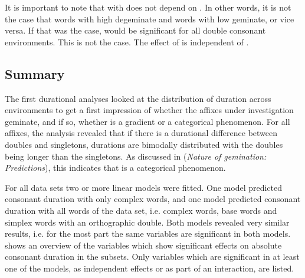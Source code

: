 It is important to note that  with  does not depend on . In other words, it is not the case that words with high  degeminate and words with low  geminate, or vice versa. If that was the case,  would be significant for all double consonant environments. This is not the case. The effect of  is independent of . 


\subsection{Summary} \label{discussion experiment}

The first durational analyses looked at the distribution of duration across environments to get a first impression of whether the affixes under investigation geminate, and if so, whether  is a gradient or a categorical phenomenon. 
For all affixes,  the analysis revealed that if there is a durational difference between doubles and singletons, durations are bimodally distributed with the doubles being longer than the singletons. As discussed in  (\textit{Nature of {gemination}: Predictions}), this indicates that  is a categorical phenomenon.

For all data sets two or more linear models were fitted. One model predicted consonant duration with only complex words, and one model predicted consonant duration with all words of the data set, i.e. complex words, base words and simplex words with an orthographic double. 
Both models revealed very similar results, i.e. for the most part the same variables are significant in both models.
 shows an overview of the variables which show significant effects on absolute consonant duration in the subsets. Only variables which are significant in at least one of the models, as independent effects or as part of an interaction, are listed. 




